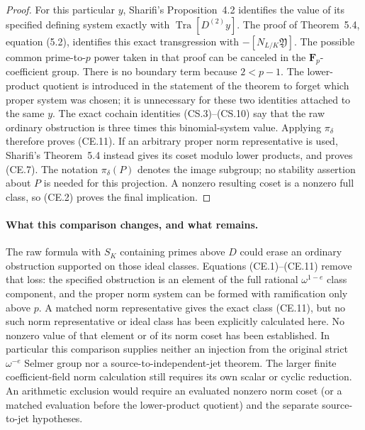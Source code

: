 \begin{proof}
For this particular \(y\), Sharifi's Proposition~4.2
identifies the value of its specified defining
system exactly with \(\operatorname{Tra}[D^{(2)}y]\).
The proof of Theorem~5.4, equation (5.2), identifies
this exact transgression with \(-[N_{L/K}\mathfrak Y]\).
The possible common prime-to-\(p\) power taken in
that proof can be canceled in the \(\mathbf F_p\)-coefficient
group.  There is no boundary term because
\(2<p-1\).  The lower-product quotient is introduced
in the statement of the theorem to forget which
proper system was chosen; it is unnecessary for
these two identities attached to the same \(y\).
The exact cochain identities (CS.3)--(CS.10) say
that the raw ordinary obstruction is three times
this binomial-system value.  Applying \(\pi_\delta\)
therefore proves (CE.11).  If an arbitrary proper
norm representative is used, Sharifi's Theorem~5.4
instead gives its coset modulo lower products,
and proves (CE.7).
The notation \(\pi_\delta(P)\) denotes the image subgroup;
no stability assertion about \(P\) is needed for this
projection.  A nonzero resulting coset is a nonzero full
class, so (CE.2) proves the final implication.
\end{proof}

\paragraph{What this comparison changes, and what remains.}
The raw formula with \(S_K\) containing primes above \(D\)
could erase an ordinary obstruction supported on those
ideal classes.  Equations (CE.1)--(CE.11) remove that loss:
the specified obstruction is an element of the full
rational \(\omega^{1-e}\) class component, and the
proper norm system can be formed with ramification only
above \(p\).  A matched norm representative gives
the exact class (CE.11), but no such norm representative
or ideal class has been explicitly calculated here.
No nonzero value of that element or of its norm coset
has been established.  In particular this
comparison supplies neither an injection from the
original strict \(\omega^{-e}\) Selmer group nor a
source-to-independent-jet theorem.  The larger finite
coefficient-field norm calculation still requires its
own scalar or cyclic reduction.  An arithmetic exclusion
would require an evaluated nonzero norm coset (or a
matched evaluation before the lower-product quotient)
and the separate source-to-jet hypotheses.

